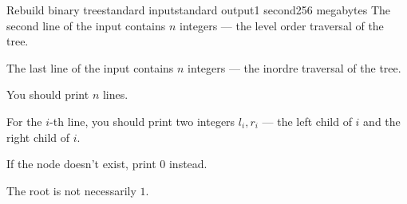 \begin{problem}{Rebuild binary tree}{standard input}{standard output}{1 second}{256 megabytes}
The second line of the input contains $n$ integers --- the level order traversal of the tree.

The last line of the input contains $n$ integers --- the inordre traversal of the tree.



\OutputFile
You should print $n$ lines.

For the $i$-th line, you should print two integers $l_i, r_i$ --- the left child of $i$ and the right child of $i$.

If the node doesn't exist, print 0 instead.




\Examples

\begin{example}
%
%
\end{example}

\Note
The root is not necessarily $1$.

    
    
\end{problem}
    
